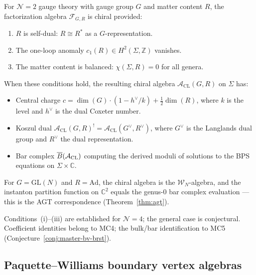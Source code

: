 \begin{conjecture}
\label{conj:cl-general-chirality}
For $\mathcal{N}=2$ gauge theory with gauge group $G$ and matter content $R$,
the factorization algebra $\mathcal{F}_{G,R}$ is chiral provided:
\begin{enumerate}[label=\textup{(\roman*)}]
\item $R$ is self-dual: $R \cong R^*$ as a $G$-representation.
\item The one-loop anomaly $c_1(R) \in H^2(\Sigma, \mathbb{Z})$ vanishes.
\item The matter content is balanced: $\chi(\Sigma, R) = 0$ for all genera.
\end{enumerate}
When these conditions hold, the resulting chiral algebra $\mathcal{A}_{\mathrm{CL}}(G, R)$
on $\Sigma$ has:
\begin{itemize}
\item Central charge $c = \dim(G) \cdot (1 - h^\vee/k) + \tfrac{1}{2}\dim(R)$,
  where $k$ is the level and $h^\vee$ is the dual Coxeter number.
\item Koszul dual $\mathcal{A}_{\mathrm{CL}}(G, R)^! = \mathcal{A}_{\mathrm{CL}}(G^\vee, R^\vee)$,
  where $G^\vee$ is the Langlands dual group and $R^\vee$ the dual representation.
\item Bar complex $\overline{B}(\mathcal{A}_{\mathrm{CL}})$ computing the derived moduli
  of solutions to the BPS equations on $\Sigma \times \mathbb{C}$.
\end{itemize}
For $G = \mathrm{GL}(N)$ and $R = \mathrm{Ad}$, the chiral algebra is the
$\mathcal{W}_N$-algebra, and the instanton partition function on $\mathbb{C}^2$
equals the genus-$0$ bar complex evaluation --- this is the AGT correspondence
(Theorem~\ref{thm:agt}).
\end{conjecture}

\begin{remark}[Scope]
Conditions~(i)--(iii) are established for $\mathcal{N}=4$; the general case is conjectural.  Coefficient identities belong to MC4; the bulk/bar identification to MC5 (Conjecture~\ref{conj:master-bv-brst}).
\end{remark}

\subsection{Paquette--Williams boundary vertex algebras}

